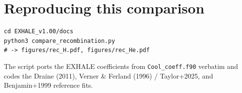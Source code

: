\documentclass[english,a4paper]{my_memo}
\begin{document}
\section{Reproducing this comparison}\label{sec:script}

\begin{verbatim}
cd EXHALE_v1.00/docs
python3 compare_recombination.py
# -> figures/rec_H.pdf, figures/rec_He.pdf
\end{verbatim}

The script ports the EXHALE coefficients from \texttt{Cool\_coeff.f90}
verbatim and codes the Draine (2011), Verner \& Ferland (1996) /
Taylor+2025, and Benjamin+1999 reference fits.
\end{document}
